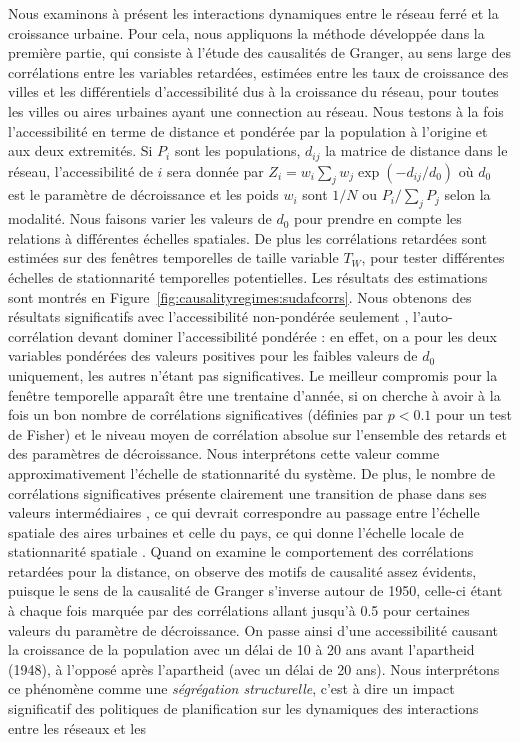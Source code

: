{Nous examinons à présent les interactions dynamiques entre le réseau ferré et la croissance urbaine. Pour cela, nous appliquons la méthode développée dans la première partie, qui consiste à l'étude des causalités de Granger, au sens large des corrélations entre les variables retardées, estimées entre les taux de croissance des villes et les différentiels d'accessibilité dus à la croissance du réseau, pour toutes les villes ou aires urbaines ayant une connection au réseau. Nous testons à la fois l'accessibilité en terme de distance et pondérée par la population à l'origine et aux deux extremités. Si $P_i$ sont les populations, $d_{ij}$ la matrice de distance dans le réseau, l'accessibilité de $i$ sera donnée par $Z_i = w_i \sum_j w_j \exp \left(- d_{ij} / d_0 \right)$ où $d_0$ est le paramètre de décroissance et les poids $w_i$ sont $1/N$ ou $P_i / \sum_j P_j$ selon la modalité. Nous faisons varier les valeurs de $d_0$ pour prendre en compte les relations à différentes échelles spatiales. De plus les corrélations retardées sont estimées sur des fenêtres temporelles de taille variable $T_W$, pour tester différentes échelles de stationnarité temporelles potentielles. Les résultats des estimations sont montrés en Figure~\ref{fig:causalityregimes:sudafcorrs}. Nous obtenons des résultats significatifs avec l'accessibilité non-pondérée seulement , l'auto-corrélation devant dominer l'accessibilité pondérée : en effet, on a pour les deux variables pondérées des valeurs positives pour les faibles valeurs de $d_0$ uniquement, les autres n'étant pas significatives. Le meilleur compromis pour la fenêtre temporelle apparaît être une trentaine d'année, si on cherche à avoir à la fois un bon nombre de corrélations significatives (définies par $p<0.1$ pour un test de Fisher) et le niveau moyen de corrélation absolue sur l'ensemble des retards et des paramètres de décroissance. Nous interprétons cette valeur comme approximativement l'échelle de stationnarité du système. De plus, le nombre de corrélations significatives présente clairement une transition de phase dans ses valeurs intermédiaires , ce qui devrait correspondre au passage entre l'échelle spatiale des aires urbaines et celle du pays, ce qui donne l'échelle locale de stationnarité spatiale . Quand on examine le comportement des corrélations retardées pour la distance, on observe des motifs de causalité assez évidents, puisque le sens de la causalité de Granger s'inverse autour de 1950, celle-ci étant à chaque fois marquée par des corrélations allant jusqu'à 0.5 pour certaines valeurs du paramètre de décroissance. On passe ainsi d'une accessibilité causant la croissance de la population avec un délai de 10 à 20 ans avant l'apartheid (1948), à l'opposé  après l'apartheid (avec un délai de 20 ans). Nous interprétons ce phénomène comme une \emph{ségrégation structurelle}, c'est à dire un impact significatif des politiques de planification sur les dynamiques des interactions entre les réseaux et les }
